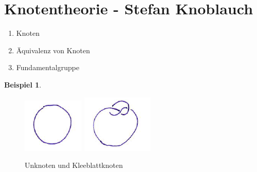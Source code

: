 \documentclass[a4paper,pagesizefontsize=12pt]{scrartcl}
\theoremstyle{definition}
\newtheorem*{bsp*}{Beispiel}
\theoremstyle{remark}
\begin{document}
\section* {Knotentheorie - Stefan Knoblauch}

\begin{enumerate}
\item Knoten
\item Äquivalenz von Knoten
\item Fundamentalgruppe
\end{enumerate}

\begin{bsp*}
\begin{figure}[H]
\center
\includegraphics[trim = 0mm 2mm 0mm 0px,clip, width=0.15\linewidth]{Unknoten}
\includegraphics[width=0.16\linewidth]{Kleeblattknoten}
\caption*{Unknoten und Kleeblattknoten}
\end{figure}
\end{bsp*}
\end{document}
